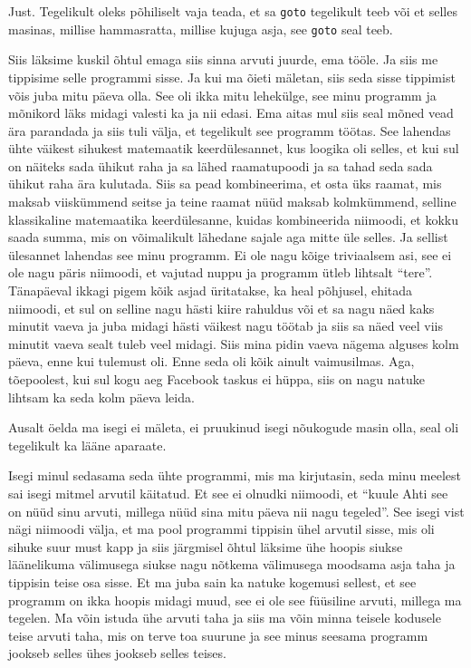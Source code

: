 
Just. Tegelikult oleks põhiliselt vaja teada, et sa \verb|goto| tegelikult teeb 
või et selles masinas, millise hammasratta, millise kujuga asja, see 
\verb|goto| seal teeb.


Siis läksime kuskil õhtul emaga siis sinna arvuti juurde, ema tööle. Ja siis me 
tippisime selle programmi sisse. Ja kui ma õieti mäletan, siis seda sisse 
tippimist võis juba mitu päeva olla. See oli ikka mitu lehekülge, see minu 
programm ja mõnikord läks midagi valesti ka ja nii edasi. Ema aitas mul siis 
seal mõned vead ära parandada ja siis tuli välja, et  tegelikult see programm 
töötas. See lahendas ühte väikest sihukest matemaatik  keerdülesannet, kus  
loogika oli  selles, et kui sul on  näiteks sada ühikut raha ja sa lähed 
raamatupoodi ja sa tahad seda sada ühikut raha ära kulutada. Siis sa pead 
kombineerima, et osta üks raamat, mis maksab viiskümmend seitse ja teine raamat 
nüüd maksab kolmkümmend, selline klassikaline  matemaatika keerdülesanne, 
kuidas kombineerida niimoodi, et kokku saada  summa, mis on võimalikult 
lähedane sajale aga mitte üle selles. Ja sellist ülesannet lahendas see minu 
programm. Ei ole nagu kõige triviaalsem asi, see ei ole nagu päris niimoodi, et 
vajutad nuppu ja programm ütleb lihtsalt \enquote{tere}. Tänapäeval ikkagi 
pigem kõik asjad üritatakse, ka heal põhjusel, ehitada niimoodi, et sul on 
selline nagu hästi kiire rahuldus või et sa nagu näed kaks minutit vaeva ja 
juba midagi hästi väikest nagu töötab ja siis sa näed veel viis minutit vaeva 
sealt tuleb veel midagi. Siis mina pidin vaeva nägema alguses kolm päeva, enne 
kui tulemust oli. Enne seda oli kõik ainult vaimusilmas.  Aga, tõepoolest, kui 
sul kogu aeg Facebook taskus ei hüppa, siis on nagu natuke lihtsam ka seda kolm 
päeva leida. 


Ausalt öelda ma isegi ei mäleta, ei pruukinud isegi nõukogude masin olla,  seal 
oli tegelikult ka lääne aparaate.

Isegi minul sedasama seda ühte programmi, mis ma kirjutasin, seda minu meelest 
sai isegi  mitmel arvutil käitatud. Et see ei olnudki niimoodi, et 
\enquote{kuule Ahti see on nüüd sinu arvuti, millega nüüd sina  mitu päeva nii 
nagu tegeled}. See isegi vist nägi niimoodi välja, et ma pool programmi 
tippisin ühel arvutil sisse, mis oli sihuke suur must kapp ja siis järgmisel 
õhtul läksime ühe hoopis siukse läänelikuma välimusega siukse nagu nõtkema 
välimusega moodsama asja taha ja tippisin teise osa sisse. Et ma juba sain ka 
natuke kogemusi sellest, et see programm on ikka hoopis midagi muud, see ei ole 
see füüsiline arvuti, millega ma tegelen. Ma võin istuda ühe arvuti taha ja 
siis ma võin minna teisele kodusele teise arvuti taha, mis on terve toa suurune 
ja see minus seesama programm jookseb selles ühes jookseb selles teises.

